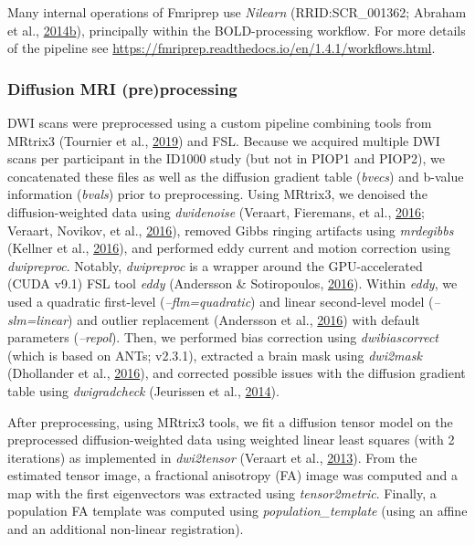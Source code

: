 \documentclass[11pt,american,]{memoir} %
\begin{document}
Many internal operations of Fmriprep use \emph{Nilearn} (RRID:SCR\_001362; Abraham et al., \protect\hyperlink{ref-Abraham2014-ef}{2014}\protect\hyperlink{ref-Abraham2014-ef}{b}), principally within the BOLD-processing workflow. For more details of the pipeline see
\url{https://fmriprep.readthedocs.io/en/1.4.1/workflows.html}.

\hypertarget{diffusion-mri-preprocessing}{%
\subsubsection{Diffusion MRI (pre)processing}\label{diffusion-mri-preprocessing}}

DWI scans were preprocessed using a custom pipeline combining tools from MRtrix3 (Tournier et al., \protect\hyperlink{ref-Tournier2019-hh}{2019}) and FSL. Because we acquired multiple DWI scans per participant in the ID1000 study (but not in PIOP1 and PIOP2), we concatenated these files as well as the diffusion gradient table (\emph{bvecs}) and b-value information (\emph{bvals}) prior to preprocessing. Using MRtrix3, we denoised the diffusion-weighted data using \emph{dwidenoise} (Veraart, Fieremans, et al., \protect\hyperlink{ref-Veraart2016-zi}{2016}; Veraart, Novikov, et al., \protect\hyperlink{ref-Veraart2016-rv}{2016}), removed Gibbs ringing artifacts using \emph{mrdegibbs} (Kellner et al., \protect\hyperlink{ref-Kellner2016-xb}{2016}), and performed eddy current and motion correction using \emph{dwipreproc}. Notably, \emph{dwipreproc} is a wrapper around the GPU-accelerated (CUDA v9.1) FSL tool \emph{eddy} (Andersson \& Sotiropoulos, \protect\hyperlink{ref-Andersson2016-pg}{2016}). Within \emph{eddy}, we used a quadratic first-level (\emph{--flm=quadratic}) and linear second-level model (\emph{--slm=linear}) and outlier replacement (Andersson et al., \protect\hyperlink{ref-Andersson2016-nm}{2016}) with default parameters (\emph{--repol}). Then, we performed bias correction using \emph{dwibiascorrect} (which is based on ANTs; v2.3.1), extracted a brain mask using \emph{dwi2mask} (Dhollander et al., \protect\hyperlink{ref-Dhollander2016-dx}{2016}), and corrected possible issues with the diffusion gradient table using \emph{dwigradcheck} (Jeurissen et al., \protect\hyperlink{ref-Jeurissen2014-cd}{2014}).

After preprocessing, using MRtrix3 tools, we fit a diffusion tensor model on the preprocessed diffusion-weighted data using weighted linear least squares (with 2 iterations) as implemented in \emph{dwi2tensor} (Veraart et al., \protect\hyperlink{ref-Veraart2013-ya}{2013}). From the estimated tensor image, a fractional anisotropy (FA) image was computed and a map with the first eigenvectors was extracted using \emph{tensor2metric}. Finally, a population FA template was computed using \emph{population\_template} (using an affine and an additional non-linear registration).
\end{document}
